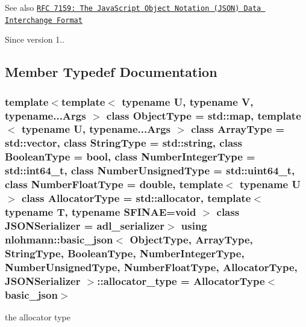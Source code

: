 \begin{DoxySeeAlso}{See also}
\href{http://rfc7159.net/rfc7159}{\tt R\+FC 7159\+: The Java\+Script Object Notation (J\+S\+ON) Data Interchange Format}
\end{DoxySeeAlso}
\begin{DoxySince}{Since}
version 1.. 
\end{DoxySince}


\subsection{Member Typedef Documentation}
\subsubsection[{\texorpdfstring{allocator\+\_\+type}{allocator_type}}]{\setlength{\rightskip}{0pt plus 5cm}template$<$template$<$ typename U, typename V, typename...\+Args $>$ class Object\+Type = std\+::map, template$<$ typename U, typename...\+Args $>$ class Array\+Type = std\+::vector, class String\+Type  = std\+::string, class Boolean\+Type  = bool, class Number\+Integer\+Type  = std\+::int64\+\_\+t, class Number\+Unsigned\+Type  = std\+::uint64\+\_\+t, class Number\+Float\+Type  = double, template$<$ typename U $>$ class Allocator\+Type = std\+::allocator, template$<$ typename T, typename S\+F\+I\+N\+A\+E=void $>$ class J\+S\+O\+N\+Serializer = adl\+\_\+serializer$>$ using {\bf nlohmann\+::basic\+\_\+json}$<$ Object\+Type, Array\+Type, String\+Type, Boolean\+Type, Number\+Integer\+Type, Number\+Unsigned\+Type, Number\+Float\+Type, Allocator\+Type, J\+S\+O\+N\+Serializer $>$\+::{\bf allocator\+\_\+type} =  Allocator\+Type$<${\bf basic\+\_\+json}$>$}\hypertarget{classnlohmann_1_1basic__json_a86ce930490cf7773b26f5ef49c04a350}{}\label{classnlohmann_1_1basic__json_a86ce930490cf7773b26f5ef49c04a350}


the allocator type 

